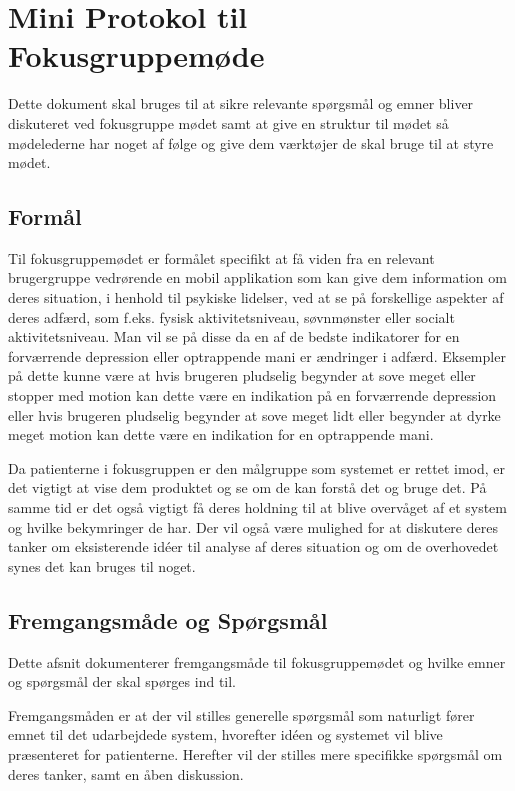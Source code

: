 \chapter*{Mini Protokol til Fokusgruppemøde}
Dette dokument skal bruges til at sikre relevante spørgsmål og emner bliver diskuteret ved fokusgruppe mødet samt at give en struktur til mødet så mødelederne har noget af følge og give dem værktøjer de skal bruge til at styre mødet.

\section*{Formål}
Til fokusgruppemødet er formålet specifikt at få viden fra en relevant brugergruppe vedrørende en mobil applikation som kan give dem information om deres situation, i henhold til psykiske lidelser, ved at se på forskellige aspekter af deres adfærd, som f.eks. fysisk aktivitetsniveau, søvnmønster eller socialt aktivitetsniveau. 
Man vil se på disse da en af de bedste indikatorer for en forværrende depression eller optrappende mani er ændringer i adfærd.
Eksempler på dette kunne være at hvis brugeren pludselig begynder at sove meget eller stopper med motion kan dette være en indikation på en forværrende depression eller hvis brugeren pludselig begynder at sove meget lidt eller begynder at dyrke meget motion kan dette være en indikation for en optrappende mani.
 
Da patienterne i fokusgruppen er den målgruppe som systemet er rettet imod, er det vigtigt at vise dem produktet og se om de kan forstå det og bruge det.
På samme tid er det også vigtigt få deres holdning til at blive overvåget af et system og hvilke bekymringer de har.
Der vil også være mulighed for at diskutere deres tanker om eksisterende idéer til analyse af deres situation og om de overhovedet synes det kan bruges til noget.

\section*{Fremgangsmåde og Spørgsmål}
Dette afsnit dokumenterer fremgangsmåde til fokusgruppemødet og hvilke emner og spørgsmål der skal spørges ind til.

Fremgangsmåden er at der vil stilles generelle spørgsmål som naturligt fører emnet til det udarbejdede system, hvorefter idéen og systemet vil blive præsenteret for patienterne. 
Herefter vil der stilles mere specifikke spørgsmål om deres tanker, samt en åben diskussion.

